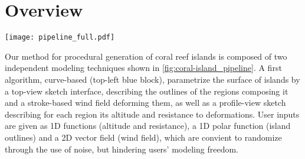 \section{Overview}


\begin{figure*}[t]
    \texttt{[image: pipeline\_full.pdf]}
    \caption{Overview of our synthetic coral island generation pipeline. The system combines two complementary data generation strategies, linked by the automatic production of samples: (1) Curve-based generation (top-left) uses user-defined outlines, elevation profiles, and deformation controls to create structured label maps and corresponding height fields. Noisy input generation (bottom-left) synthesizes diverse examples using the user inputs with slight randomization, which are then stored in an example set and enhanced via data augmentation (center), including translation, scaling, and copy-pasting. (2) These pairs of label maps and height fields are used to train a conditional Generative Adversarial Network (cGAN) (right), where the generator $G$ learns to produce height fields from label maps, and the discriminator $D$ distinguishes "real" from "fake" data (i.e. produced from the curve-based generation agains those network-generated). After training, the inference model can generate realistic coral island terrain from new label maps designed by the user.}
    \label{fig:coral-island_pipeline}
\end{figure*}

Our method for procedural generation of coral reef islands is composed of two independent modeling techniques shown in \cref{fig:coral-island_pipeline}. A first algorithm, curve-based (top-left blue block), parametrize the surface of islands by a top-view sketch interface, describing the outlines of the regions composing it and a stroke-based wind field deforming them, as well as a profile-view sketch describing for each region its altitude and resistance to deformations. User inputs are given as 1D functions (altitude and resistance), a 1D polar function (island outlines) and a 2D vector field (wind field), which are convient to randomize through the use of noise, but hindering users' modeling freedom.

